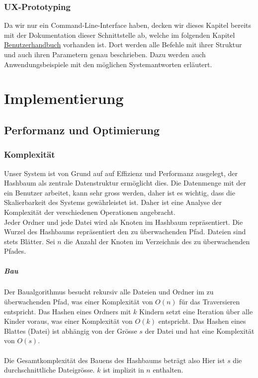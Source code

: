 \documentclass[a4paper,12pt]{report}
\begin{document}
    \newpage

    \subsection{UX-Prototyping}
    Da wir nur ein Command-Line-Interface haben, decken wir dieses Kapitel bereits mit
    der Dokumentation dieser Schnittstelle ab, welche im folgenden Kapitel \hyperref[sec:user-manual]{Benutzerhandbuch} vorhanden ist.
    Dort werden alle Befehle mit ihrer Struktur und auch ihren Parametern genau beschrieben.
    Dazu werden auch Anwendungsbeispiele mit den möglichen Systemantworten erläutert.


    \chapter{Implementierung}


    \section{Performanz und Optimierung}

    \subsection{Komplexität}

    Unser System ist von Grund auf auf Effizienz und Performanz ausgelegt, der Hashbaum als zentrale Datenstruktur ermöglicht dies.
    Die Datenmenge mit der ein Benutzer arbeitet, kann sehr gross werden, daher ist es wichtig, dass die Skalierbarkeit des Systems gewährleistet ist.
    Daher ist eine Analyse der Komplexität der verschiedenen Operationen angebracht.
    \\
    Jeder Ordner und jede Datei wird als Knoten im Hashbaum repräsentiert.
    Die Wurzel des Hashbaums repräsentiert den zu überwachenden Pfad.
    Dateien sind stets Blätter.\newline
    Sei $n$ die Anzahl der Knoten im Verzeichnis des zu überwachenden Pfades.

    \paragraph{Bau}
    Der Baualgorithmus besucht rekursiv alle Dateien und Ordner im zu überwachenden Pfad,
    was einer Komplexität von $O(n)$ für das Traversieren entspricht.
    Das Hashen eines Ordners mit $k$ Kindern setzt eine Iteration über alle Kinder voraus, was einer Komplexität von $O(k)$ entspricht.
    Das Hashen eines Blattes (Datei) ist abhängig von der Grösse $s$ der Datei und hat eine Komplexität von $O(s)$.
    \\\\
    Die Gesamtkomplexität des Bauens des Hashbaums beträgt also 
    Hier ist $s$ die durchschnittliche Dateigrösse. $k$ ist implizit in $n$ enthalten.
\end{document}
